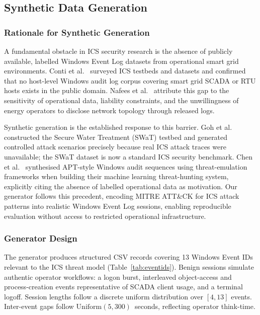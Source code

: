 \label{sec:data}

\subsection{Synthetic Data Generation}

\subsubsection{Rationale for Synthetic Generation}
A fundamental obstacle in ICS security research is the absence of publicly available,
labelled Windows Event Log datasets from operational smart grid environments.
Conti et al.\ \cite{conti2021survey} surveyed ICS testbeds and datasets and confirmed
that no host-level Windows audit log corpus covering smart grid SCADA or RTU hosts exists
in the public domain. Nafees et al.\ \cite{nafees2023} attribute this gap to the
sensitivity of operational data, liability constraints, and the unwillingness of energy
operators to disclose network topology through released logs.

Synthetic generation is the established response to this barrier. Goh et al.\
\cite{goh2016swat} constructed the Secure Water Treatment (SWaT) testbed and generated
controlled attack scenarios precisely because real ICS attack traces were unavailable;
the SWaT dataset is now a standard ICS security benchmark. Chen et al.\ \cite{chen2022}
synthesised APT-style Windows audit sequences using threat-emulation frameworks when
building their machine learning threat-hunting system, explicitly citing the absence of
labelled operational data as motivation. Our generator follows this precedent, encoding
MITRE ATT\&CK for ICS attack patterns \cite{mitre2020attack} into realistic Windows Event
Log sessions, enabling reproducible evaluation without access to restricted operational
infrastructure.

\subsubsection{Generator Design}
The generator produces structured CSV records covering 13 Windows Event IDs relevant to
the ICS threat model (Table~\ref{tab:eventids}). Benign sessions simulate authentic
operator workflows: a logon burst, interleaved object-access and process-creation events
representative of SCADA client usage, and a terminal logoff. Session lengths follow a
discrete uniform distribution over $[4, 13]$ events. Inter-event gaps follow
$\text{Uniform}(5, 300)$~seconds, reflecting operator think-time.

